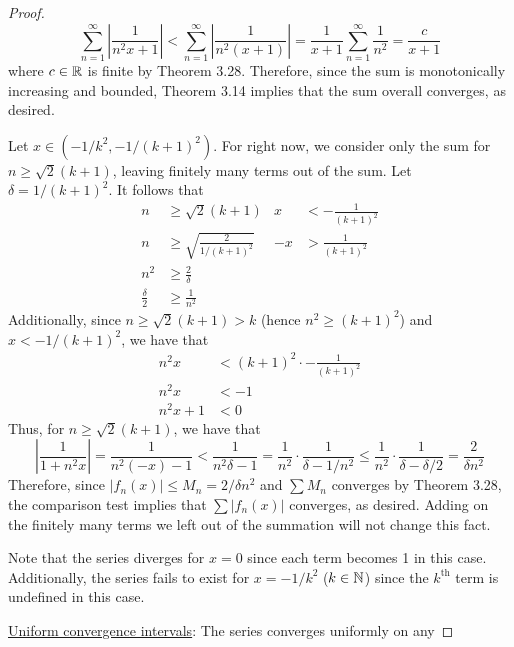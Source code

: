 \documentclass[../psets.tex]{subfiles}
\begin{document}
\begin{enumerate}[label={\textbf{\arabic*.}}]
\begin{proof}
\begin{equation*}
            \sum_{n=1}^\infty\left| \frac{1}{n^2x+1} \right| < \sum_{n=1}^\infty\left| \frac{1}{n^2(x+1)} \right|
            = \frac{1}{x+1}\sum_{n=1}^\infty\frac{1}{n^2}
            = \frac{c}{x+1}
        \end{equation*}
        where $c\in\mathbb{R}$ is finite by Theorem 3.28. Therefore, since the sum is monotonically increasing and bounded, Theorem 3.14 implies that the sum overall converges, as desired.\par
        Let $x\in(-1/k^2,-1/(k+1)^2)$. For right now, we consider only the sum for $n\geq\sqrt{2}(k+1)$, leaving finitely many terms out of the sum. Let $\delta=1/(k+1)^2$. It follows that
        \begin{align*}
            n &\geq \sqrt{2}(k+1)&
                x &< -\frac{1}{(k+1)^2}\\
            n &\geq \sqrt{\frac{2}{1/(k+1)^2}}&
                -x &> \frac{1}{(k+1)^2}\\
            n^2 &\geq \frac{2}{\delta}\\
            \frac{\delta}{2} &\geq \frac{1}{n^2}
        \end{align*}
        Additionally, since $n\geq\sqrt{2}(k+1)>k$ (hence $n^2\geq(k+1)^2$) and $x<-1/(k+1)^2$, we have that
        \begin{align*}
            n^2x &< (k+1)^2\cdot -\frac{1}{(k+1)^2}\\
            n^2x &< -1\\
            n^2x+1 &< 0
        \end{align*}
        Thus, for $n\geq\sqrt{2}(k+1)$, we have that
        \begin{equation*}
            \left| \frac{1}{1+n^2x} \right| = \frac{1}{n^2(-x)-1}
            < \frac{1}{n^2\delta-1}
            = \frac{1}{n^2}\cdot\frac{1}{\delta-1/n^2}
            \leq \frac{1}{n^2}\cdot\frac{1}{\delta-\delta/2}
            = \frac{2}{\delta n^2}
        \end{equation*}
        Therefore, since $|f_n(x)|\leq M_n=2/\delta n^2$ and $\sum M_n$ converges by Theorem 3.28, the comparison test implies that $\sum|f_n(x)|$ converges, as desired. Adding on the finitely many terms we left out of the summation will not change this fact.\par
        Note that the series diverges for $x=0$ since each term becomes 1 in this case. Additionally, the series fails to exist for $x=-1/k^2$ ($k\in\mathbb{N}$) since the $k^\text{th}$ term is undefined in this case.\par\medskip
        \underline{Uniform convergence intervals}: The series converges uniformly on any

\end{proof}
\end{enumerate}
\end{document}
